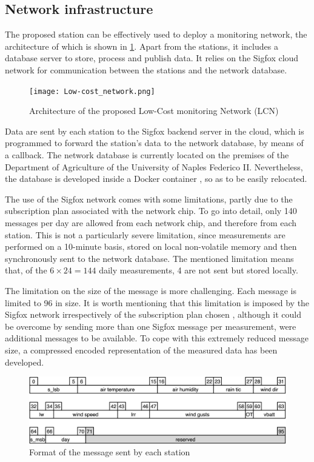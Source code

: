 \documentclass[conference]{IEEEtran}
\begin{document}
\subsection{Network infrastructure}
The proposed station can be effectively used to deploy a monitoring network, the architecture of which is shown in \cref{fig:network}. Apart from the stations, it includes a database server to store, process and publish data. 
It relies on the Sigfox cloud network \cite{sigfox:network-architecture} for communication between the stations and the network database.

\begin{figure}
    \centering
    \texttt{[image: Low-cost\_network.png]}
    \caption{Architecture of the proposed Low-Cost monitoring Network (LCN)}
    \label{fig:network}
\end{figure}
Data are sent by each station to the Sigfox backend server in the cloud, which is programmed to forward the station's data to the network database, by means of a callback. The network database is currently located on the premises of the Department of Agriculture of the University of Naples Federico II. 
Nevertheless, the database is developed inside a Docker container \cite{docker:mainpage}, so as to be easily relocated.

The use of the Sigfox network comes with some limitations, partly due to the subscription plan associated with the network chip.
To go into detail, only 140 messages per day are allowed from each network chip, and therefore from each station. 
This is not a particularly severe limitation, since measurements are performed on a 10-minute basis, stored on local non-volatile memory and then synchronously sent to the network database. 
The mentioned limitation means that, of the  \(6\times 24 = 144\) daily measurements, 4 are not sent but stored locally.

The limitation on the size of the message is more challenging. 
Each message is limited to \SI{96}{\bit} in size. 
It is worth mentioning that this limitation is imposed by the Sigfox network irrespectively of the subscription plan chosen \cite{sigfox:network-architecture}, although it could be overcome by sending more than one Sigfox message per measurement, were additional messages to be available. 
To cope with this extremely reduced message size, a compressed encoded representation of the measured data has been developed. 

\begin{figure}
    \centering
    \includegraphics[scale=.55]{message_format.png}
    \caption{Format of the message sent by each station}
    \label{fig:message-format}
\end{figure}
\end{document}
